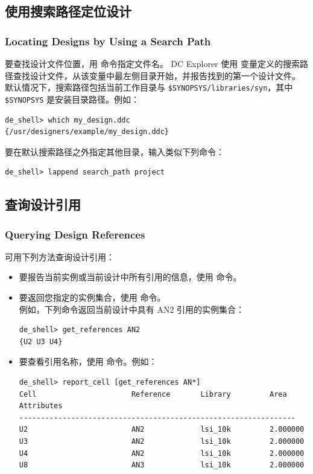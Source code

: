 \subsection{使用搜索路径定位设计}
\subsubsection*{Locating Designs by Using a Search Path}

要查找设计文件位置，用  命令指定文件名。
DC Explorer 使用  变量定义的搜索路径查找设计文件，从该变量中最左侧目录开始，并报告找到的第一个设计文件。
默认情况下，搜索路径包括当前工作目录与 \texttt{\$SYNOPSYS/libraries/syn}，其中 \texttt{\$SYNOPSYS} 是安装目录路径。例如：
\begin{lstlisting}
de_shell> which my_design.ddc
{/usr/designers/example/my_design.ddc}
\end{lstlisting}

要在默认搜索路径之外指定其他目录，输入类似下列命令：
\begin{lstlisting}
de_shell> lappend search_path project
\end{lstlisting}

\subsection{查询设计引用}
\subsubsection*{Querying Design References}

可用下列方法查询设计引用：
\begin{itemize}
  \item 要报告当前实例或当前设计中所有引用的信息，使用  命令。
  \item 要返回您指定的实例集合，使用  命令。\\
        例如，下列命令返回当前设计中具有 AN2 引用的实例集合：
\begin{lstlisting}
de_shell> get_references AN2
{U2 U3 U4}
\end{lstlisting}
  \item 要查看引用名称，使用  命令。例如：
\begin{lstlisting}
de_shell> report_cell [get_references AN*]
Cell                      Reference       Library         Area
Attributes
----------------------------------------------------------------
U2                        AN2             lsi_10k         2.000000
U3                        AN2             lsi_10k         2.000000
U4                        AN2             lsi_10k         2.000000
U8                        AN3             lsi_10k         2.000000
\end{lstlisting}
\end{itemize}

